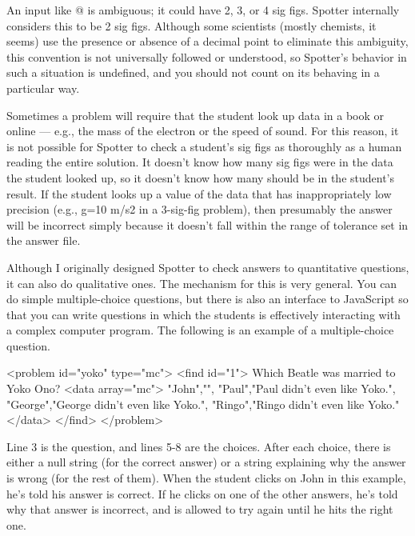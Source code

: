 \documentclass{doc}
\begin{document}
An input like @ is ambiguous; it could have 2, 3, or 4 sig figs. Spotter internally
considers this to be 2 sig figs. Although some scientists (mostly chemists, it seems) use the presence or absence of a decimal
point to eliminate this ambiguity, this convention is not universally followed or understood, so Spotter's behavior
in such a situation is undefined, and you should not count on its behaving in a particular way.

Sometimes a problem will require that the student look up data in a book or online --- e.g.,
the mass of the electron or the speed of sound. For this reason, it is not possible for
Spotter to check a student's sig figs as thoroughly as a human reading the entire solution.
It doesn't know how many sig figs were in the data the student looked up, so it doesn't
know how many should be in the student's result.
If the student looks up a value of the data that has inappropriately low precision
(e.g., g=10 m/s2 in a 3-sig-fig problem), then presumably the answer will be incorrect
simply because it doesn't fall within the range of tolerance set in the answer file.

\label{qualitative}
Although I originally designed Spotter to check answers to quantitative questions,
it can also do qualitative ones. The mechanism for this is very general. You can
do simple multiple-choice questions, but there is also an interface to JavaScript
so that you can write questions in which the students is effectively interacting
with a complex computer program. The following is an example of a multiple-choice
question.
\begin{listing}{1}
<problem id="yoko" type="mc">
  <find id="1">
    Which Beatle was married to Yoko Ono?
    <data array="mc">
      "John","",
      "Paul","Paul didn't even like Yoko.",
      "George","George didn't even like Yoko.",
      "Ringo","Ringo didn't even like Yoko."
    </data>
  </find>
</problem>
\end{listing}
Line 3 is the question, and lines 5-8 are the choices. After each choice,
there is either a null string (for the correct answer) or a string explaining
why the answer is wrong (for the rest of them). When the student clicks on
John in this example, he's told his answer is correct. If he clicks on one
of the other answers, he's told why that answer is incorrect, and is allowed
to try again until he hits the right one.
\end{document}
